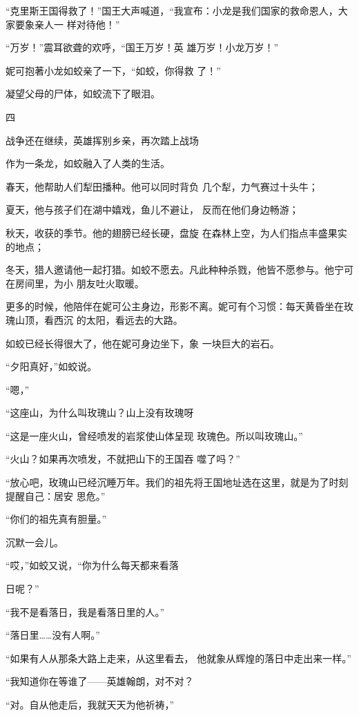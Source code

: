 \documentclass{article}
\begin{document}
“克里斯王国得救了！”国王大声喊道，“我宣布：小龙是我们国家的救命恩人，大家要象亲人一
样对待他！” 

“万岁！”震耳欲聋的欢呼，“国王万岁！英
雄万岁！小龙万岁！” 

妮可抱著小龙如蛟亲了一下，“如蛟，你得救
了！” 


凝望父母的尸体，如蛟流下了眼泪。 


四 

战争还在继续，英雄挥别乡亲，再次踏上战场


作为一条龙，如蛟融入了人类的生活。 

\newpage

春天，他帮助人们犁田播种。他可以同时背负
几个犁，力气赛过十头牛； 

夏天，他与孩子们在湖中嬉戏，鱼儿不避让，
反而在他们身边畅游； 

秋天，收获的季节。他的翅膀已经长硬，盘旋
在森林上空，为人们指点丰盛果实的地点； 

冬天，猎人邀请他一起打猎。如蛟不愿去。凡此种种杀戮，他皆不愿参与。他宁可在房间里，为小
朋友吐火取暖。 

更多的时候，他陪伴在妮可公主身边，形影不离。妮可有个习惯：每天黄昏坐在玫瑰山顶，看西沉
的太阳，看远去的大路。 

如蛟已经长得很大了，他在妮可身边坐下，象
一块巨大的岩石。 


\newpage

“夕阳真好，”如蛟说。 


“嗯，” 

“这座山，为什么叫玫瑰山？山上没有玫瑰呀

“这是一座火山，曾经喷发的岩浆使山体呈现
玫瑰色。所以叫玫瑰山。” 

“火山？如果再次喷发，不就把山下的王国吞
噬了吗？” 

“放心吧，玫瑰山已经沉睡万年。我们的祖先将王国地址选在这里，就是为了时刻提醒自己：居安
思危。” 


“你们的祖先真有胆量。” 


沉默一会儿。 

“哎，”如蛟又说，“你为什么每天都来看落

\newpage
日呢？” 


“我不是看落日，我是看落日里的人。” 


“落日里……没有人啊。” 

“如果有人从那条大路上走来，从这里看去，
他就象从辉煌的落日中走出来一样。” 

“我知道你在等谁了——英雄翰朗，对不对？


“对。自从他走后，我就天天为他祈祷，” 
\end{document}
